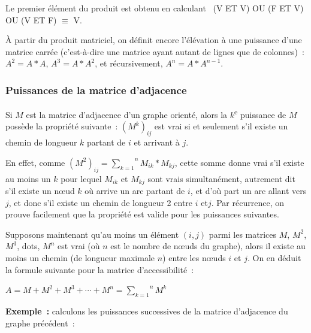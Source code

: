 			Le premier élément du produit est obtenu en calculant \
			(V ET V) OU (F ET V) OU (V ET F) ${\equiv}$ V.

			À partir du produit matriciel, on définit encore l'élévation 
			à une puissance d'une matrice carrée (c'est-à-dire une
			matrice ayant autant de lignes que de colonnes)~: 
			$A^2 = A*A$, $A^3 = A*A^2$, et récursivement, $A^n = A*A^{n-1}$.
			
		\subsubsection{Puissances de la matrice d'adjacence}

			Si $M$ est la matrice d'adjacence d'un graphe orienté, 
			alors la $k$\textsuperscript{e} puissance de
			$M$ possède la propriété suivante~: 
			$(M^k)_{ij}$ est vrai si et seulement s'il existe un chemin de 
			longueur $k$ partant de $i$ et arrivant à $j$.

			En effet, comme $(M^2)_{ij}=\overset n{\underset{k=1}\sum} M_{ik}\ast M_{kj}$, 
			cette somme donne vrai s'il existe au moins un $k$ pour lequel $M_{ik}$ et
			$M_{kj}$ sont vrais simultanément, autrement dit s'il existe un n{\oe}ud
			$k$ où arrive un arc partant de $i$, et d'où part un arc allant vers
			$j$, et donc s'il existe un chemin de longueur 2 entre $i$ et$j$. 
			Par récurrence, on prouve facilement que la propriété
			est valide pour les puissances suivantes.

			Supposons maintenant qu'au moins un élément $(i, j)$ 
			parmi les matrices $M$, $M^2$, $M^3$, {dots}, $M^n$ est vrai
			(où $n$ est le nombre de n{\oe}uds du graphe), 
			alors il existe au moins un chemin (de longueur maximale $n$) 
			entre les n{\oe}uds $i$ et $j$. On en déduit la formule suivante 
			pour la matrice	d'accessibilité~:

			\begin{center}
			$A=M+M^2+M^3+\cdots +M^n=\overset n{\underset{k=1}{\sum }}M^k$
			\end{center}
			
			\textbf{Exemple~:} calculons les puissances successives 
			de la matrice d'adjacence du graphe précédent~:


